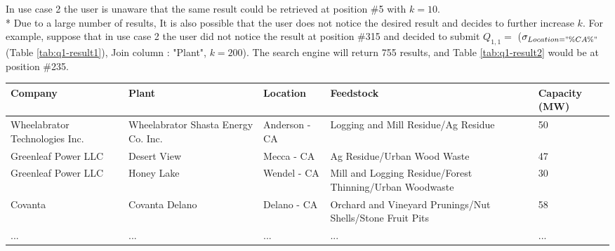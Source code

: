 In use case 2 the user is unaware that the same result could be retrieved at position \#5 with $k = 10$.  \\* Due to a large number of results, It is also possible that the user does not notice the desired result and decides to further increase $k$. For example, suppose that in use case 2 the user did not notice the result at position \#315 and decided to submit $Q_{1,1} =$ ($\sigma_{Location = "\%CA\%"}$(Table \ref{tab:q1-result1}), Join column : "Plant", $k = 200$). The search engine will return 755 results, and Table \ref{tab:q1-result2} would be at position \#235.

\begin{table*}[p!]
	\setlength\extrarowheight{2pt} %
	\begin{tabular}{ |l|p{2cm}|p{3cm}|p{2cm}|l|  }
		\hline
		\textbf{Company}&	\textbf{Plant}&	\textbf{Location}&	\textbf{Feedstock}&	\textbf{Capacity (MW)}\\
		\hline
		Wheelabrator Technologies Inc.& 	Wheelabrator Shasta Energy Co. Inc.& 	Anderson - CA& 	Logging and Mill Residue/Ag Residue& 	50\\
		\hline
		Greenleaf Power LLC& 	Desert View& 	Mecca - CA& 	Ag Residue/Urban Wood Waste& 	47\\
		\hline
		Greenleaf Power LLC& 	Honey Lake& 	Wendel - CA&	Mill and Logging Residue/Forest Thinning/Urban Woodwaste& 	30\\
		\hline
		Covanta& 	Covanta Delano& 	Delano - CA& 	Orchard and Vineyard Prunings/Nut Shells/Stone Fruit Pits& 	58\\
		\hline
		... & ... & ... & ... & ...\\
		\hline
		
	\end{tabular}
	\vspace{.2cm}
	\caption{U.S. Biomass Power Plants\label{tab:q1-result1}}
\end{table*}
	

